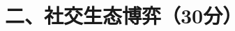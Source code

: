 \documentclass[class=exam-zh, crop]{standalone}
\begin{document}
\section{二、社交生态博弈（30分）}
\end{document}
